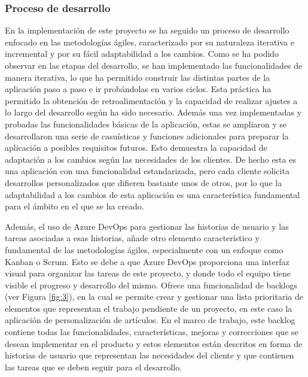 \documentclass[12pt]{article}
\begin{document}
\subsubsection{Proceso de desarrollo}
En la implementación de este proyecto se ha seguido un proceso de desarrollo enfocado en las metodologías ágiles, caracterizado por su naturaleza iterativa e incremental y por su fácil adaptabilidad a los cambios. Como se ha podido observar en las etapas del desarrollo,
se han implementado las funcionalidades de manera iterativa, lo que ha permitido construir las distintas partes de la aplicación paso a paso e ir probándolas en varios ciclos.
Esta práctica ha permitido la obtención de retroalimentación y la capacidad de realizar ajustes a lo largo del desarrollo según ha sido necesario.
Además una vez implementadas y probadas las funcionalidades básicas de la aplicación, estas se ampliaron y se desarrollaron una serie de casuísticas y funciones adicionales para preparar la aplicación a posibles
requisitos futuros. Esto demuestra la capacidad de adaptación a los cambios según las necesidades de los clientes. De hecho esta es una aplicación con una funcionalidad estandarizada, pero 
cada cliente solicita desarrollos personalizados que difieren bastante unos de otros, por lo que la adaptabilidad a los cambios de esta aplicación es una característica fundamental para el ámbito en el que se ha creado.

Además, el uso de Azure DevOps para gestionar las historias de usuario y las tareas asociadas a esas historias, añade otro elemento característico y fundamental de las metodologías ágiles, especialmente con un enfoque como Kanban o Scrum.
Esto se debe a que Azure DevOps proporciona una interfaz visual para organizar las tareas de este proyecto, y donde todo el equipo tiene visible el progreso y desarrollo del mismo.
Ofrece una funcionalidad de backlogs (ver Figura \ref{fig:3}), en la cual se permite crear y gestionar una lista prioritaria de elementos que representan el trabajo pendiente de un proyecto, en este caso la aplicación de personalización de artículos. En el marco de trabajo, este backlog contiene todas las funcionalidades, características, mejoras y correcciones que se desean implementar
en el producto y estos elementos están descritos en forma de historias de usuario que representan las necesidades del cliente y que contienen las tareas que se deben seguir para el desarrollo.
\end{document}
